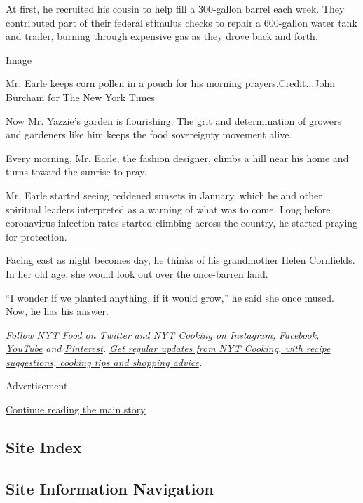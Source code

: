 At first, he recruited his cousin to help fill a 300-gallon barrel each
week. They contributed part of their federal stimulus checks to repair a
600-gallon water tank and trailer, burning through expensive gas as they
drove back and forth.

Image

Mr. Earle keeps corn pollen in a pouch for his morning
prayers.Credit...John Burcham for The New York Times

Now Mr. Yazzie's garden is flourishing. The grit and determination of
growers and gardeners like him keeps the food sovereignty movement
alive.

Every morning, Mr. Earle, the fashion designer, climbs a hill near his
home and turns toward the sunrise to pray.

Mr. Earle started seeing reddened sunsets in January, which he and other
spiritual leaders interpreted as a warning of what was to come. Long
before coronavirus infection rates started climbing across the country,
he started praying for protection.

Facing east as night becomes day, he thinks of his grandmother Helen
Cornfields. In her old age, she would look out over the once-barren
land.

``I wonder if we planted anything, if it would grow,'' he said she once
mused. Now, he has his answer.

\emph{Follow} \href{https://twitter.com/nytfood}{\emph{NYT Food on
Twitter}} \emph{and}
\href{https://www.instagram.com/nytcooking/}{\emph{NYT Cooking on
Instagram}}\emph{,}
\href{https://www.facebook.com/nytcooking/}{\emph{Facebook}}\emph{,}
\href{https://www.youtube.com/nytcooking}{\emph{YouTube}} \emph{and}
\href{https://www.pinterest.com/nytcooking/}{\emph{Pinterest}}\emph{.}
\href{https://www.nytimes.com/newsletters/cooking}{\emph{Get regular
updates from NYT Cooking, with recipe suggestions, cooking tips and
shopping advice}}\emph{.}

Advertisement

\protect\hyperlink{after-bottom}{Continue reading the main story}

\hypertarget{site-index}{%
\subsection{Site Index}\label{site-index}}

\hypertarget{site-information-navigation}{%
\subsection{Site Information
Navigation}\label{site-information-navigation}}

